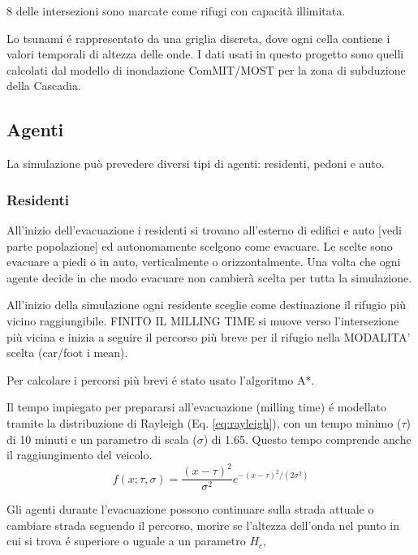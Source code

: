 8 delle intersezioni sono marcate come rifugi con capacità illimitata.

Lo tsunami é rappresentato da una griglia discreta, dove ogni cella contiene i valori temporali di altezza delle onde.
I dati usati in questo progetto sono quelli calcolati dal modello di inondazione ComMIT/MOST \cite{titov1997implementation} per la zona di subduzione della Cascadia.



\subsection{Agenti}
La simulazione può prevedere diversi tipi di agenti: residenti, pedoni e auto.

\subsubsection{Residenti}
All'inizio dell'evacuazione i residenti si trovano all'esterno di edifici e auto [vedi parte popolazione]
ed autonomamente scelgono come evacuare. Le scelte sono evacuare a piedi o in auto, verticalmente o orizzontalmente.
Una volta che ogni agente decide in che modo evacuare non cambierà scelta per tutta la simulazione.

All'inizio della simulazione ogni residente sceglie come destinazione il rifugio più vicino raggiungibile.
FINITO IL MILLING TIME si muove verso l'intersezione più vicina e
inizia a seguire il percorso più breve per il rifugio nella MODALITA' scelta (car/foot i mean).

\vspace*{4mm}
Per calcolare i percorsi più brevi é stato usato l'algoritmo A*.

\vspace*{4mm}
Il tempo impiegato per prepararsi all'evacuazione (milling time) é modellato tramite
la distribuzione di Rayleigh (Eq. \ref{eq:rayleigh}), con un tempo minimo ($\tau$) di 10 minuti
e un parametro di scala ($\sigma$) di 1.65.
Questo tempo comprende anche il raggiungimento del veicolo.
%
\begin{equation}
  f(x; \tau, \sigma) = \frac{(x - \tau)^2}{\sigma^2}e^{-{(x - \tau)^2}/(2\sigma^2)}
  \label{eq:rayleigh}
\end{equation}

Gli agenti durante l'evacuazione possono continuare sulla strada attuale o cambiare strada seguendo il percorso,
morire se l'altezza dell'onda nel punto in cui si trova é superiore o uguale a un parametro $H_c$,

